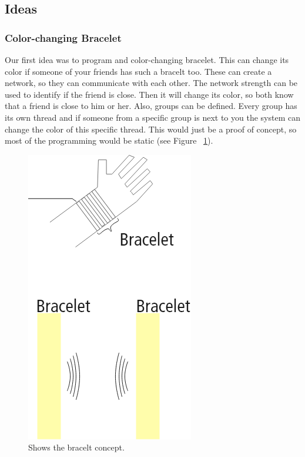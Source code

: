 \documentclass[12pt,twoside,a4paper]{article}
\begin{document}
    \subsection{Ideas}
    \subsubsection{Color-changing Bracelet}
    \begin{flushleft}
        Our first idea was to program and color-changing bracelet. This can change its color if someone of your
        friends has such a bracelt too. These can create a network, so they can communicate with each other. The
        network strength can be used to identify if the friend is close. Then it will change its color, so both know
        that a friend is close to him or her. Also, groups can be defined. Every group has its own thread and if someone 
        from a specific group is next to you the system can change the color of this specific thread. This would just 
        be a proof of concept, so most of the programming would be static (see Figure ~\ref{fig:braceltIdea}).
    \end{flushleft}

    \begin{figure}[h!]
        \centering
        \includegraphics[scale=0.4]{images/projectideas/bracelt.png}
        \caption{Shows the bracelt concept.}
        \label{fig:braceltIdea}
    \end{figure}
\end{document}
